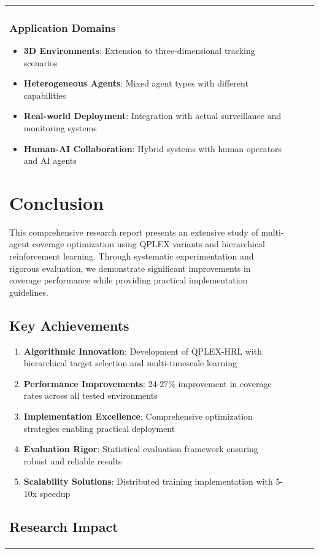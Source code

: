 \documentclass[12pt,a4paper]{report}
\begin{document}
\begin{table}[H]
\begin{table}[H]
\begin{tabular}{lccc}
\begin{table}[H]
\begin{table}[H]
\subsection{Application Domains}
\begin{itemize}
\item \textbf{3D Environments}: Extension to three-dimensional tracking scenarios
\item \textbf{Heterogeneous Agents}: Mixed agent types with different capabilities
\item \textbf{Real-world Deployment}: Integration with actual surveillance and monitoring systems
\item \textbf{Human-AI Collaboration}: Hybrid systems with human operators and AI agents
\end{itemize}

\chapter{Conclusion}

This comprehensive research report presents an extensive study of multi-agent coverage optimization using QPLEX variants and hierarchical reinforcement learning. Through systematic experimentation and rigorous evaluation, we demonstrate significant improvements in coverage performance while providing practical implementation guidelines.

\section{Key Achievements}

\begin{enumerate}
\item \textbf{Algorithmic Innovation}: Development of QPLEX-HRL with hierarchical target selection and multi-timescale learning
\item \textbf{Performance Improvements}: 24-27\% improvement in coverage rates across all tested environments
\item \textbf{Implementation Excellence}: Comprehensive optimization strategies enabling practical deployment
\item \textbf{Evaluation Rigor}: Statistical evaluation framework ensuring robust and reliable results
\item \textbf{Scalability Solutions}: Distributed training implementation with 5-10x speedup
\end{enumerate}

\section{Research Impact}


\end{table}
\end{table}
\end{tabular}
\end{table}
\end{table}
\end{document}
